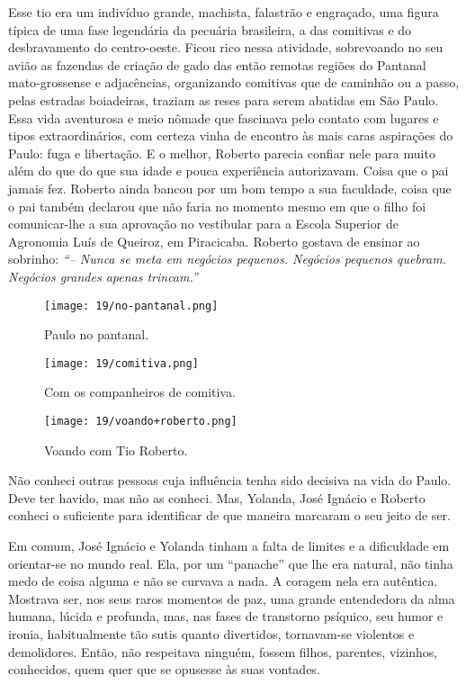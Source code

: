 Esse tio era um indivíduo grande, machista, falastrão e engraçado, uma figura típica de uma fase legendária da pecuária brasileira, a das comitivas e do desbravamento do centro-oeste.
Ficou rico nessa atividade, sobrevoando no seu avião as fazendas de criação de gado das então remotas regiões do Pantanal mato-grossense e adjacências, organizando comitivas que de caminhão ou a passo, pelas estradas boiadeiras, traziam as reses para serem abatidas em São Paulo.
Essa vida aventurosa e meio nômade que fascinava pelo contato com lugares e tipos extraordinários, com certeza vinha de encontro às mais caras aspirações do Paulo: fuga e libertação.
E o melhor, Roberto parecia confiar nele para muito além do que do que sua idade e pouca experiência autorizavam.
Coisa que o pai jamais fez.
Roberto ainda bancou por um bom tempo a sua faculdade, coisa que o pai também declarou que não faria no momento mesmo em que o filho foi comunicar-lhe a sua aprovação no vestibular para a Escola Superior de Agronomia Luís de Queiroz, em Piracicaba.
Roberto gostava de ensinar ao sobrinho: \textit{``-- Nunca se meta em negócios pequenos.
Negócios pequenos quebram.
Negócios grandes apenas trincam.''}

\begin{figure}
\centering
\texttt{[image: 19/no-pantanal.png]}
\caption{Paulo no pantanal.}
\end{figure}

\begin{figure}
\centering
\texttt{[image: 19/comitiva.png]}
\caption{Com os companheiros de comitiva.}
\end{figure}


\begin{figure}
\centering
\texttt{[image: 19/voando+roberto.png]}
\caption{Voando com Tio Roberto.}
\end{figure}

Não conheci outras pessoas cuja influência tenha sido decisiva na vida do Paulo.
Deve ter havido, mas não as conheci.
Mas, Yolanda, José Ignácio e Roberto conheci o suficiente para identificar de que maneira marcaram o seu jeito de ser.


Em comum, José Ignácio e Yolanda tinham a falta de limites e a dificuldade em orientar-se no mundo real.
Ela, por um ``panache'' que lhe era natural, não tinha medo de coisa alguma e não se curvava a nada.
A coragem nela era autêntica.
Mostrava ser, nos seus raros momentos de paz, uma grande entendedora da alma humana, lúcida e profunda, mas, nas fases de transtorno psíquico, seu humor e ironia, habitualmente tão sutis quanto divertidos, tornavam-se violentos e demolidores.
Então, não respeitava ninguém, fossem filhos, parentes, vizinhos, conhecidos, quem quer que se opusesse às suas vontades.


